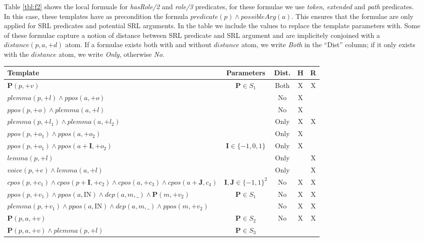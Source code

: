 Table \ref{tbl:f2} shows the local formuale for \emph{hasRole/2} and 
\emph{role/3} predicates,  for these formulae we use \emph{token}, 
\emph{extended} and \emph{path} predicates. In this case, these templates have 
as precondition the formula $predicate(p) \land possibleArg(a)$. This ensures that
the formulae are only applied for SRL predicates and potential SRL arguments.  
In the table we include the values to replace the template parameters with. Some 
of these formulae capture a notion of distance between SRL predicate and SRL 
argument and are implicitely conjoined with a $distance(p,a,+d)$ atom. If a formulae exists
both with and without $distance$ atom, we write \emph{Both} in the ``Dist'' column; if it only exists
with the $distance$ atom, we write \emph{Only}, otherwise \emph{No}.
\begin{table*}[th]
\centering
\begin{tabular}{|>{\small}p{10cm}|>{\small}c|>{\small}c|>{\small}c|>{\small}c|}\hline
 Template               & Parameters & Dist. & H & R \\\hline
   $ \mathbf{P}(p,+v)         $    & $\mathbf{P} \in S_1$   & Both & X & X \\
   $ plemma (p,+l) \land ppos(a,+o) $   & & No    & X &  \\
   $ ppos(p,+o)    \land plemma(a,+l)  $   & & No    & X &  \\
   $ plemma(p,+l_1) \land plemma(a,+l_2)$   & & Only  & X & X \\
   $ ppos(p,+o_1) \land ppos(a,+o_2)$       & & Only  & X &   \\
   $ ppos(p,+o_1) \land ppos(a+\mathbf{I},+o_2)$     & $\mathbf{I} \in 
   \{-1,0,1\}$ & Only& X &   \\
   $ lemma(p,+l)$ & & Only & & X  \\
   $ voice(p,+e) \land lemma(a,+l)$ & & Only & & X  \\
   $ cpos(p,+c_1) \land cpos(p+\mathbf{I},+c_2) \land cpos(a,+c_3) \land 
   cpos(a+\mathbf{J},c_4)$ & $\mathbf{I},\mathbf{J} \in \{-1,1\}^2$ & No & X & 
   X\\
   $ ppos(p,+v_1) \land ppos(a,\text{IN}) \land dep(a,m,\_) \land \mathbf{P}(m,+v_2) $ & $\mathbf{P} \in S_1$ & No & X &  X \\
   $ plemma(p,+v_1) \land ppos(a,\text{IN}) \land dep(a,m,\_) \land ppos(m,+v_2) $ & & No & X &  X \\
   $ \mathbf{P}(p,a,+v)         $    & $\mathbf{P} \in S_2$ & No & X & X \\
   $ \mathbf{P}(p,a,+v) \land plemma(p,+l) $ & $\mathbf{P} \in S_3$           & 

\end{tabular}
\end{table*}
